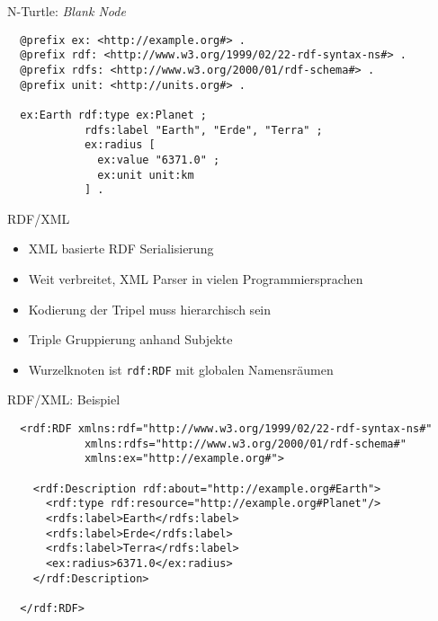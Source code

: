 \documentclass{beamer}
\begin{document}
\begin{frame}[fragile]{N-Turtle: \emph{Blank Node}}
	
	\small
	\begin{lstlisting}
  @prefix ex: <http://example.org#> .
  @prefix rdf: <http://www.w3.org/1999/02/22-rdf-syntax-ns#> .
  @prefix rdfs: <http://www.w3.org/2000/01/rdf-schema#> .
  @prefix unit: <http://units.org#> .
	  
  ex:Earth rdf:type ex:Planet ;
            rdfs:label "Earth", "Erde", "Terra" ;
            ex:radius [
              ex:value "6371.0" ;
              ex:unit unit:km
            ] .
	\end{lstlisting}
	
\end{frame}

\begin{frame}{RDF/XML}
	
	\begin{itemize}
		\item XML basierte RDF Serialisierung
		\item Weit verbreitet, XML Parser in vielen Programmiersprachen
		\item Kodierung der Tripel muss hierarchisch sein
		\item Triple Gruppierung anhand Subjekte
		\item Wurzelknoten ist \texttt{rdf:RDF} mit globalen Namensräumen
	\end{itemize}
	
\end{frame}

\begin{frame}[fragile]{RDF/XML: Beispiel}
	
	\footnotesize
	\begin{lstlisting}
  <rdf:RDF xmlns:rdf="http://www.w3.org/1999/02/22-rdf-syntax-ns#"
            xmlns:rdfs="http://www.w3.org/2000/01/rdf-schema#"
            xmlns:ex="http://example.org#">
	
    <rdf:Description rdf:about="http://example.org#Earth">
      <rdf:type rdf:resource="http://example.org#Planet"/>
      <rdfs:label>Earth</rdfs:label>
      <rdfs:label>Erde</rdfs:label>
      <rdfs:label>Terra</rdfs:label>
      <ex:radius>6371.0</ex:radius>
    </rdf:Description>
	
  </rdf:RDF>		
	\end{lstlisting}
	
\end{frame}
\end{document}
